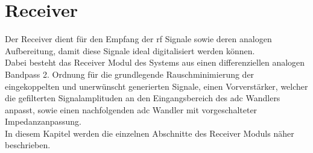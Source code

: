\section{Receiver}\label{sec:receiver}
Der Receiver dient für den Empfang der \ac{rf} Signale sowie deren analogen Aufbereitung, damit diese Signale ideal digitalisiert werden können.\\
Dabei besteht das Receiver Modul des Systems aus einen differenziellen analogen Bandpass 2. Ordnung für die grundlegende Rauschminimierung der eingekoppelten und unerwünscht generierten Signale, einen Vorverstärker, welcher die gefilterten Signalamplituden an den Eingangsbereich des \ac{adc} Wandlers anpasst, sowie einen nachfolgenden \ac{adc} Wandler mit vorgeschalteter Impedanzanpassung.\\
In diesem Kapitel werden die einzelnen Abschnitte des Receiver Moduls näher beschrieben.
